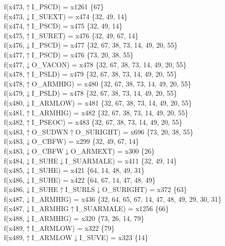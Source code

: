 f(x473,$\uparrow$I\_PSCD) = x1261 \{67\} \\  
f(x473,$\downarrow$I\_SUEXT) = x474 \{32, 49, 14\} \\  
f(x474,$\uparrow$I\_PSCD) = x475 \{32, 49, 14\} \\  
f(x475,$\uparrow$I\_SURET) = x476 \{32, 49, 67, 14\} \\  
f(x476,$\downarrow$I\_PSCD) = x477 \{32, 67, 38, 73, 14, 49, 20, 55\} \\  
f(x477,$\uparrow$I\_PSCD) = x476 \{73, 20, 38, 55\} \\  
f(x477,$\downarrow$O\_VACON) = x478 \{32, 67, 38, 73, 14, 49, 20, 55\} \\  
f(x478,$\uparrow$I\_PSLD) = x479 \{32, 67, 38, 73, 14, 49, 20, 55\} \\  
f(x478,$\uparrow$O\_ARMHIG) = x480 \{32, 67, 38, 73, 14, 49, 20, 55\} \\  
f(x479,$\downarrow$I\_PSLD) = x478 \{32, 67, 38, 73, 14, 49, 20, 55\} \\  
f(x480,$\downarrow$I\_ARMLOW) = x481 \{32, 67, 38, 73, 14, 49, 20, 55\} \\  
f(x481,$\uparrow$I\_ARMHIG) = x482 \{32, 67, 38, 73, 14, 49, 20, 55\} \\  
f(x482,$\uparrow$I\_PSEOC) = x483 \{32, 67, 38, 73, 14, 49, 20, 55\} \\  
f(x483,$\uparrow$O\_SUDWN$\uparrow$O\_SURIGHT) = x696 \{73, 20, 38, 55\} \\  
f(x483,$\downarrow$O\_CBFW) = x299 \{32, 49, 67, 14\} \\  
f(x483,$\downarrow$O\_CBFW$\downarrow$O\_ARMEXT) = x300 \{26\} \\  
f(x484,$\downarrow$I\_SUHE$\downarrow$I\_SUARMALE) = x411 \{32, 49, 14\} \\  
f(x485,$\downarrow$I\_SUHE) = x421 \{64, 14, 48, 49, 31\} \\  
f(x486,$\downarrow$I\_SUHE) = x422 \{64, 67, 14, 47, 48, 49\} \\  
f(x486,$\downarrow$I\_SUHE$\uparrow$I\_SURLS$\downarrow$O\_SURIGHT) = x372 \{63\} \\  
f(x487,$\downarrow$I\_ARMHIG) = x436 \{32, 64, 65, 67, 14, 47, 48, 49, 29, 30, 31\} \\  
f(x487,$\downarrow$I\_ARMHIG$\uparrow$I\_SUARMALE) = x1256 \{66\} \\  
f(x488,$\downarrow$I\_ARMHIG) = x320 \{73, 26, 14, 79\} \\  
f(x489,$\uparrow$I\_ARMLOW) = x322 \{79\} \\  
f(x489,$\uparrow$I\_ARMLOW$\downarrow$I\_SUVE) = x323 \{14\} \\  

